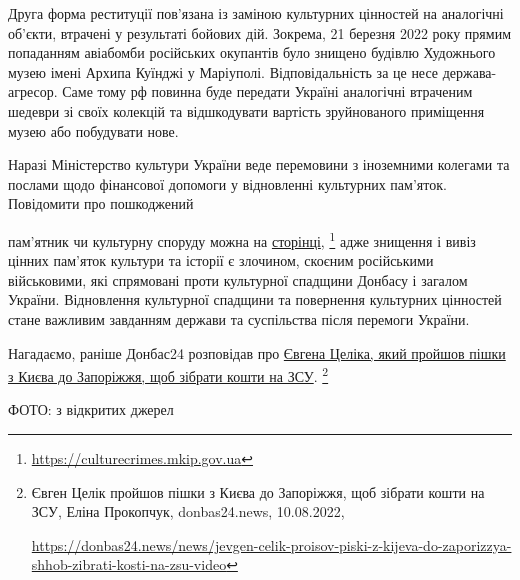 Друга форма реституції пов'язана із заміною культурних цінностей на аналогічні
об'єкти, втрачені у результаті бойових дій. Зокрема, 21 березня 2022 року
прямим попаданням авіабомби російських окупантів було знищено будівлю
Художнього музею імені Архипа Куїнджі у Маріуполі. Відповідальність за це несе
держава-агресор. Саме тому рф повинна буде передати Україні аналогічні
втраченим шедеври зі своїх колекцій та відшкодувати вартість зруйнованого
приміщення музею або побудувати нове.

Наразі Міністерство культури України веде перемовини з іноземними колегами та
послами щодо фінансової допомоги у відновленні культурних пам'яток. Повідомити
про пошкоджений\par\noindent пам'ятник чи культурну споруду можна на \href{https://culturecrimes.mkip.gov.ua/}{сторінці},%
\footnote{\url{https://culturecrimes.mkip.gov.ua}}
адже знищення
і вивіз цінних пам'яток культури та історії є злочином, скоєним російськими
військовими, які спрямовані проти культурної спадщини Донбасу і загалом
України. Відновлення культурної спадщини та повернення культурних цінностей
стане важливим завданням держави та суспільства після перемоги України.

Нагадаємо, раніше Донбас24 розповідав про \href{https://donbas24.news/news/jevgen-celik-proisov-piski-z-kijeva-do-zaporizzya-shhob-zibrati-kosti-na-zsu-video}{Євгена Целіка, який пройшов пішки з
Києва до Запоріжжя, щоб зібрати кошти на ЗСУ}.%
\footnote{Євген Целік пройшов пішки з Києва до Запоріжжя, щоб зібрати кошти на ЗСУ, Еліна Прокопчук, donbas24.news, 10.08.2022, \par%
\url{https://donbas24.news/news/jevgen-celik-proisov-piski-z-kijeva-do-zaporizzya-shhob-zibrati-kosti-na-zsu-video}%
}

ФОТО: з відкритих джерел

